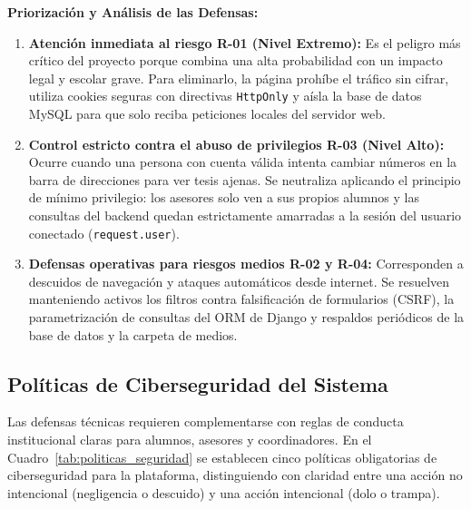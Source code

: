 \noindent \textbf{Priorización y Análisis de las Defensas:}
\begin{enumerate}
    \item \textbf{Atención inmediata al riesgo R-01 (Nivel Extremo):} Es el peligro más crítico del proyecto porque combina una alta probabilidad con un impacto legal y escolar grave. Para eliminarlo, la página prohíbe el tráfico sin cifrar, utiliza cookies seguras con directivas \texttt{HttpOnly} y aísla la base de datos MySQL para que solo reciba peticiones locales del servidor web.
    \item \textbf{Control estricto contra el abuso de privilegios R-03 (Nivel Alto):} Ocurre cuando una persona con cuenta válida intenta cambiar números en la barra de direcciones para ver tesis ajenas. Se neutraliza aplicando el principio de mínimo privilegio: los asesores solo ven a sus propios alumnos y las consultas del backend quedan estrictamente amarradas a la sesión del usuario conectado (\texttt{request.user}).
    \item \textbf{Defensas operativas para riesgos medios R-02 y R-04:} Corresponden a descuidos de navegación y ataques automáticos desde internet. Se resuelven manteniendo activos los filtros contra falsificación de formularios (CSRF), la parametrización de consultas del ORM de Django y respaldos periódicos de la base de datos y la carpeta de medios.
\end{enumerate}

\subsection{Políticas de Ciberseguridad del Sistema}
\label{subsec:politicas_seguridad}

Las defensas técnicas requieren complementarse con reglas de conducta institucional claras para alumnos, asesores y coordinadores. En el Cuadro~\ref{tab:politicas_seguridad} se establecen cinco políticas obligatorias de ciberseguridad para la plataforma, distinguiendo con claridad entre una acción no intencional (negligencia o descuido) y una acción intencional (dolo o trampa).

